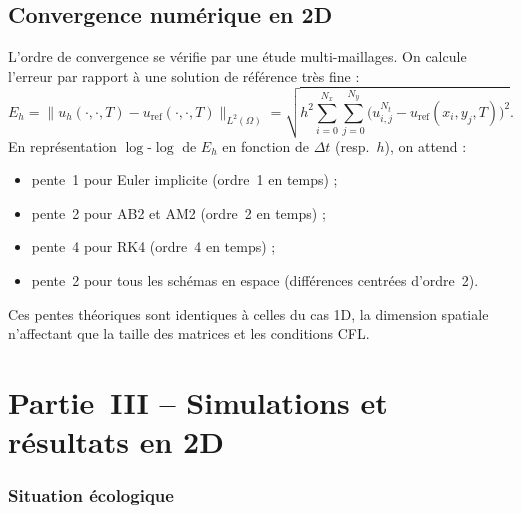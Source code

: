 \documentclass[11pt,a4paper]{report}
\begin{document}
\section{Convergence num\'erique en 2D}

L'ordre de convergence se v\'erifie par une \'etude multi-maillages. On calcule l'erreur
par rapport \`a une solution de r\'ef\'erence tr\`es fine :
\begin{equation}
  E_h = \bigl\|u_h(\cdot,\cdot,T) - u_{\text{ref}}(\cdot,\cdot,T)\bigr\|_{L^2(\Omega)}
  = \sqrt{h^2\sum_{i=0}^{N_x}\sum_{j=0}^{N_y}
    \bigl(u_{i,j}^{N_t} - u_{\text{ref}}(x_i,y_j,T)\bigr)^2}.
\end{equation}
En repr\'esentation $\log$-$\log$ de $E_h$ en fonction de $\Delta t$ (resp.~$h$), on attend :
\begin{itemize}[leftmargin=1.5em]
  \item pente~1 pour Euler implicite (ordre~1 en temps) ;
  \item pente~2 pour AB2 et AM2 (ordre~2 en temps) ;
  \item pente~4 pour RK4 (ordre~4 en temps) ;
  \item pente~2 pour tous les sch\'emas en espace (diff\'erences centr\'ees d'ordre~2).
\end{itemize}
Ces pentes th\'eoriques sont identiques \`a celles du cas 1D, la dimension spatiale
n'affectant que la taille des matrices et les conditions CFL.

\chapter{Partie~III -- Simulations et r\'esultats en 2D}

\subsection*{Situation \'ecologique}
\end{document}
